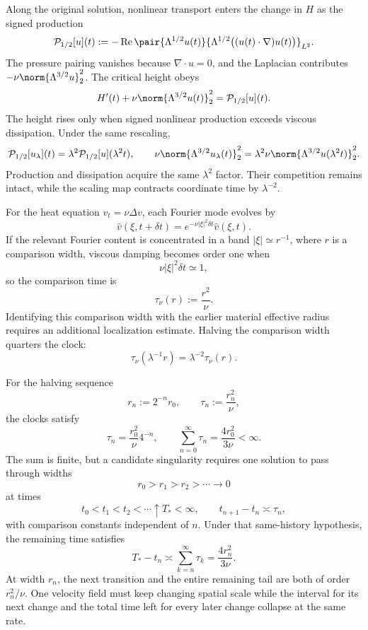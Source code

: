 
Along the original solution, nonlinear transport enters the change in \(H\) as the signed production
\[
  \mathcal P_{1/2}[u](t)
  :=
  -\operatorname{Re}
  \pair
    {\Lambda^{1/2}u(t)}
    {\Lambda^{1/2}\bigl((u(t)\cdot\nabla)u(t)\bigr)}_{L^2}.
\]
The pressure pairing vanishes because \(\nabla\cdot u=0\), and the Laplacian contributes \(-\nu\norm{\Lambda^{3/2}u}_2^2\). The critical height obeys
\[
  H'(t)
  +
  \nu\norm{\Lambda^{3/2}u(t)}_2^2
  =
  \mathcal P_{1/2}[u](t).
\]
The height rises only when signed nonlinear production exceeds viscous dissipation. Under the same rescaling,
\[
  \mathcal P_{1/2}[u_\lambda](t)
  =
  \lambda^2\mathcal P_{1/2}[u](\lambda^2t),
  \qquad
  \nu\norm{\Lambda^{3/2}u_\lambda(t)}_2^2
  =
  \lambda^2\nu\norm{\Lambda^{3/2}u(\lambda^2t)}_2^2.
\]
Production and dissipation acquire the same \(\lambda^2\) factor. Their competition remains intact, while the scaling map contracts coordinate time by \(\lambda^{-2}\).


For the heat equation \(v_t=\nu\Delta v\), each Fourier mode evolves by
\[
  \widehat v(\xi,t+\delta t)
  =
  e^{-\nu|\xi|^2\delta t}\widehat v(\xi,t).
\]
If the relevant Fourier content is concentrated in a band \(|\xi|\simeq r^{-1}\), where \(r\) is a comparison width, viscous damping becomes order one when
\[
  \nu|\xi|^2\delta t\simeq1,
\]
so the comparison time is
\[
  \tau_\nu(r)
  :=
  \frac{r^2}{\nu}.
\]
Identifying this comparison width with the earlier material effective radius requires an additional localization estimate. Halving the comparison width quarters the clock:
\[
  \tau_\nu(\lambda^{-1}r)
  =
  \lambda^{-2}\tau_\nu(r).
\]


For the halving sequence
\[
  r_n:=2^{-n}r_0,
  \qquad
  \tau_n:=\frac{r_n^2}{\nu},
\]
the clocks satisfy
\[
  \tau_n
  =
  \frac{r_0^2}{\nu}4^{-n},
  \qquad
  \sum_{n=0}^{\infty}\tau_n
  =
  \frac{4r_0^2}{3\nu}
  <
  \infty.
\]
The sum is finite, but a candidate singularity requires one \NavierStokes{} solution to pass through widths
\[
  r_0>r_1>r_2>\cdots\longrightarrow0
\]
at times
\[
  t_0<t_1<t_2<\cdots\uparrow T_*<\infty,
  \qquad
  t_{n+1}-t_n\asymp\tau_n,
\]
with comparison constants independent of \(n\). Under that same-history hypothesis, the remaining time satisfies
\[
  T_*-t_n
  \asymp
  \sum_{k=n}^{\infty}\tau_k
  =
  \frac{4r_n^2}{3\nu}.
\]
At width \(r_n\), the next transition and the entire remaining tail are both of order \(r_n^2/\nu\). One velocity field must keep changing spatial scale while the interval for its next change and the total time left for every later change collapse at the same rate.
